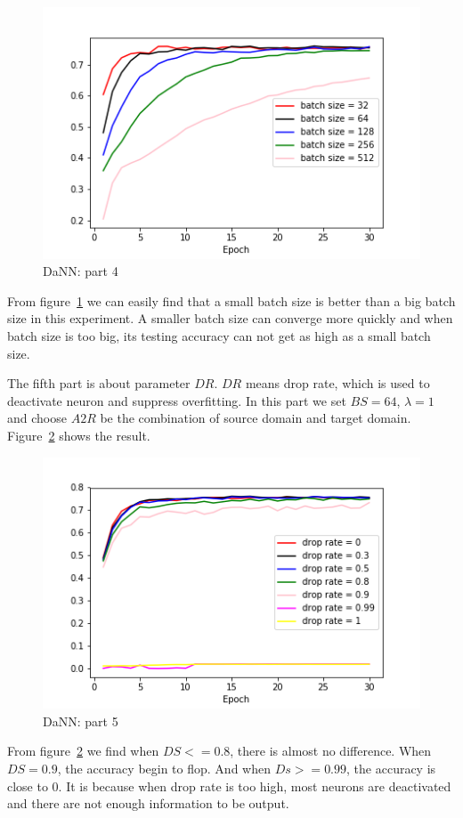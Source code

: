 \documentclass[conference]{IEEEtran}
\begin{document}
\begin{figure}[!h]
    \centerline{\includegraphics[scale=0.4]{HDaNN/DaNN_fig4.png}}
    \caption{DaNN: part 4}
    \label{fig:DaNN4}
\end{figure}

From figure~\ref{fig:DaNN4} we can easily find that a small batch size is better than a big batch size in this experiment. A smaller batch size can converge more quickly and when batch size is too big, its testing accuracy can not get as high as a small batch size.

The fifth part is about parameter $DR$. $DR$ means drop rate, which is used to deactivate neuron and suppress overfitting.  In this part we set $BS = 64$, $\lambda = 1$ and choose $A2R$ be the combination of source domain and target domain. Figure~\ref{fig:DaNN5} shows the result.
\begin{figure}[!h]
    \centerline{\includegraphics[scale=0.4]{HDaNN/DaNN_fig5.png}}
    \caption{DaNN: part 5}
    \label{fig:DaNN5}
\end{figure}

From figure~\ref{fig:DaNN5} we find when $DS <= 0.8$, there is almost no difference. When $DS = 0.9$, the accuracy begin to flop. And when $Ds>=0.99$, the accuracy is close to 0. It is because when drop rate is too high, most neurons are deactivated and there are not enough information to be output. 
\end{document}
